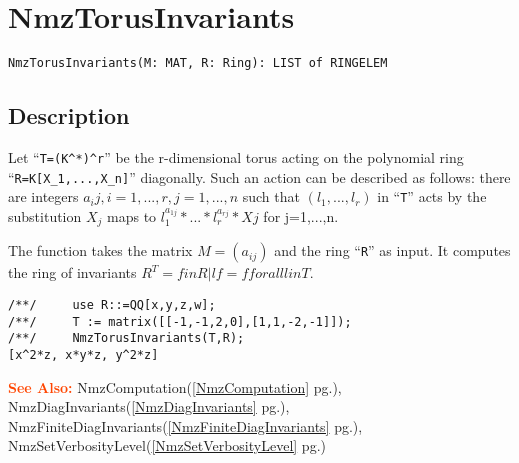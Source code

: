 \documentclass[a4paper]{mybook}
\newenvironment{command}{}{} %
\newcommand\SeeAlso{\par\textcolor{OrangeRed}{\textbf{\large See Also: }}}
\begin{document}
\section{NmzTorusInvariants}
\label{NmzTorusInvariants}
\begin{command} %


\begin{Verbatim}[label=syntax, rulecolor=\color{MidnightBlue},
frame=single]
NmzTorusInvariants(M: MAT, R: Ring): LIST of RINGELEM
\end{Verbatim}


\subsection*{Description}

Let ``\verb&T=(K^*)^r&'' be the r-dimensional torus acting on the polynomial ring
``\verb&R=K[X_1,...,X_n]&'' diagonally.  Such an action can be described as follows:
there are integers $a_ij, i=1,...,r, j=1,...,n$ such that $(l_1,...,l_r)$ in ``\verb&T&''
acts by the substitution  $X_j$ maps to $l_1^{a_{1j}} * ... * l_r^{a_{rj}} * Xj$ for j=1,...,n.

The function takes the matrix $M = (a_{ij})$ and the ring ``\verb&R&'' as input.
It computes the ring of invariants $R^T = {f in R | lf = f for all l in T}$.
\begin{Verbatim}[label=example, rulecolor=\color{PineGreen}, frame=single]
/**/     use R::=QQ[x,y,z,w];
/**/     T := matrix([[-1,-1,2,0],[1,1,-2,-1]]);
/**/     NmzTorusInvariants(T,R);
[x^2*z, x*y*z, y^2*z]
\end{Verbatim}


\SeeAlso %
  NmzComputation(\ref{NmzComputation} pg.\pageref{NmzComputation}), 
    NmzDiagInvariants(\ref{NmzDiagInvariants} pg.\pageref{NmzDiagInvariants}), 
    NmzFiniteDiagInvariants(\ref{NmzFiniteDiagInvariants} pg.\pageref{NmzFiniteDiagInvariants}), 
    NmzSetVerbosityLevel(\ref{NmzSetVerbosityLevel} pg.\pageref{NmzSetVerbosityLevel})
\end{command} %
\end{document}
